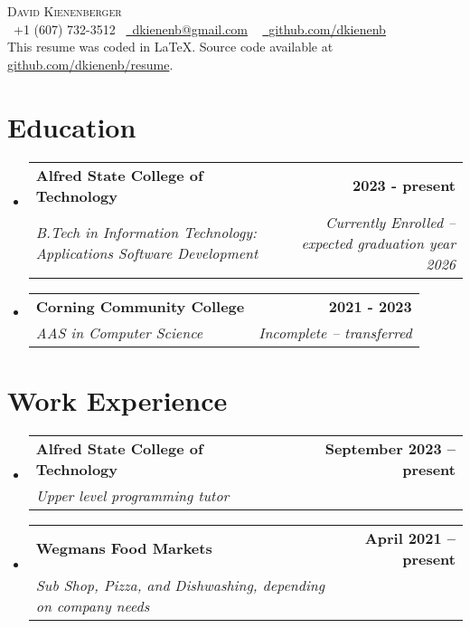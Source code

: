 \documentclass[letterpaper,11pt]{article}
\makeatletter
\newcommand{\resumeSubheading}[4]{
  \vspace{-2pt}\item
    \begin{tabular*}{1.0\textwidth}[t]{l@{\extracolsep{\fill}}r}
      \textbf{#1} & \textbf{\small #2} \\
      \textit{\small#3} & \textit{\small #4} \\
    \end{tabular*}\vspace{-7pt}
}
\newcommand{\resumeSubHeadingListStart}{\begin{itemize}[leftmargin=0.0in, label={}]}
\newcommand{\resumeSubHeadingListEnd}{\end{itemize}}
\makeatother
\begin{document}
\begin{center}
  {\Huge \scshape David Kienenberger} \\ \vspace{5pt}
  \small \raisebox{-0.1\height}\faPhone\ +1 (607) 732-3512~ \href{mailto:dkienenb@gmail.com}{\raisebox{-0.2\height}\faEnvelope\  \underline{dkienenb@gmail.com}} ~
  \href{https://github.com/dkienenb}{\raisebox{-0.2\height}\faGithub\ \underline{github.com/dkienenb}} \\
  \vspace{2pt}
  \footnotesize This resume was coded in \LaTeX. Source code available at \href{https://github.com/dkienenb/resume}{github.com/dkienenb/resume}.
\end{center}

\vspace{-10pt}
\section{Education}
\resumeSubHeadingListStart
\resumeSubheading
{Alfred State College of Technology}{2023 - present}{B.Tech in Information Technology: Applications Software Development}{Currently Enrolled -- expected graduation year 2026}
\resumeSubheading
{Corning Community College}{2021 - 2023}{AAS in Computer Science}{Incomplete -- transferred}
\resumeSubHeadingListEnd
\vspace{-10pt}



\section{Work Experience}
\resumeSubHeadingListStart

\resumeSubheading
{Alfred State College of Technology}{September 2023 -- present}
{Upper level programming tutor}{}
\resumeSubheading
{Wegmans Food Markets}{April 2021 -- present}
{Sub Shop, Pizza, and Dishwashing, depending on company needs}{}
\resumeSubHeadingListEnd
\vspace{-10pt}
\end{document}
